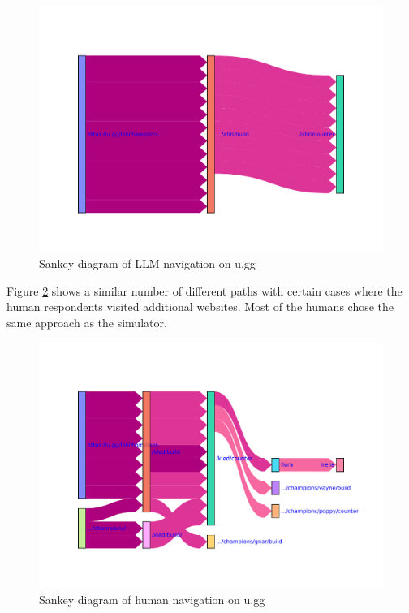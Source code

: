 \begin{figure}[H]
    \centering
    \includegraphics[width=\textwidth]{obrazky-figures/sankey_ugg_llm.pdf}
    \caption{Sankey diagram of LLM navigation on u.gg}
    \label{sankey_ugg_llm}
\end{figure}

Figure \ref{sankey_ugg_human} shows a similar number of different paths with certain cases where the human respondents visited additional websites. Most of the humans chose the same approach as the simulator.  

\begin{figure}[H]
    \centering
    \includegraphics[width=\textwidth]{obrazky-figures/sankey_ugg_human.pdf}
    \caption{Sankey diagram of human navigation on u.gg}
    \label{sankey_ugg_human}
\end{figure}

